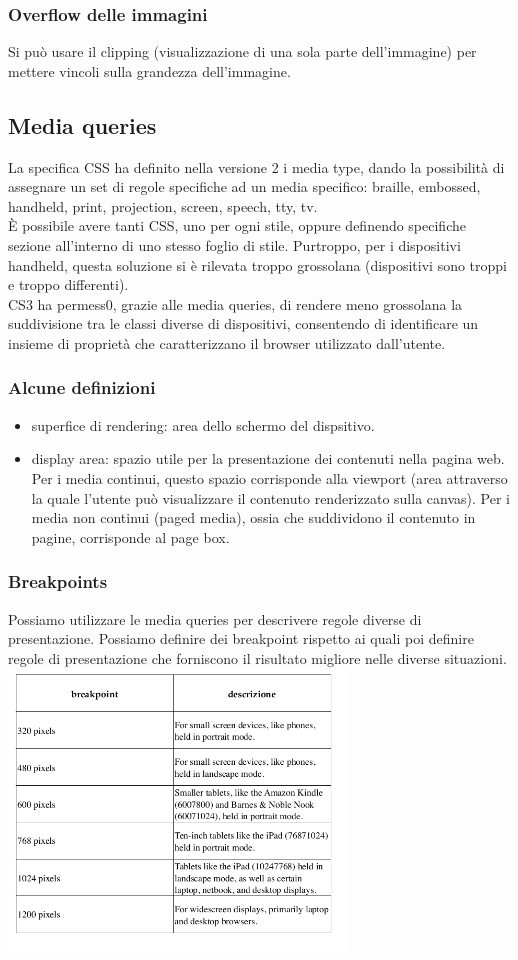 \documentclass{article}
\begin{document}
\subsubsection{Overflow delle immagini}
Si può usare il clipping (visualizzazione di una sola parte dell'immagine) per mettere vincoli sulla grandezza dell'immagine.
\subsection{Media queries}
La specifica CSS ha definito nella versione 2 i media type, dando la possibilità di assegnare un set di regole specifiche ad un media specifico: braille, embossed, handheld, print, projection, screen, speech, tty, tv.\\
È possibile avere tanti CSS, uno per ogni stile, oppure definendo specifiche sezione all'interno di uno stesso foglio di stile. Purtroppo, per i dispositivi handheld, questa soluzione si è rilevata troppo grossolana (dispositivi sono troppi e troppo differenti).\\
CS3 ha permess0, grazie alle media queries, di rendere meno grossolana la suddivisione tra le classi diverse di dispositivi, consentendo di identificare un insieme di proprietà che caratterizzano il browser utilizzato dall'utente.
\subsubsection{Alcune definizioni}
\begin{itemize}
	\item superfice di rendering: area dello schermo del dispsitivo.
	\item display area: spazio utile per la presentazione dei contenuti nella pagina web. Per i media continui, questo spazio corrisponde alla viewport (area attraverso la quale l'utente può visualizzare il contenuto renderizzato sulla canvas). Per i media non continui (paged media), ossia che suddividono il contenuto in pagine, corrisponde al page box.
\end{itemize}
\subsubsection{Breakpoints}
Possiamo utilizzare le media queries per descrivere regole diverse di presentazione. Possiamo definire dei breakpoint rispetto ai quali poi definire regole di presentazione che forniscono il risultato migliore nelle diverse situazioni.\\
\includegraphics[width=9cm]{breakpoint}\\
\end{document}
